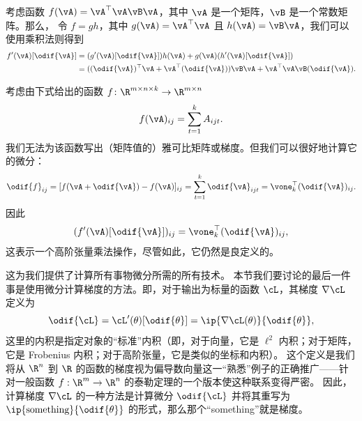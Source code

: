 \documentclass[../../book-main_zh.tex]{subfiles}
\begin{document}
\begin{example}
    考虑函数 \(f(\vA) = \vA^{\top}\vA\vB\vA\)，其中
    \(\vA\) 是一个矩阵，\(\vB\) 是一个常数矩阵。那么，
    令 \(f = gh\)，其中 \(g(\vA) = \vA^{\top}\vA\) 且 \(h(\vA)
    = \vB\vA\)，我们可以使用乘积法则得到
    \begin{align}
        f^{\prime}(\vA)[\odif{\vA}]
        &= (g^{\prime}(\vA)[\odif{\vA}])h(\vA) +
        g(\vA)(h^{\prime}(\vA)[\odif{\vA}]) \\
        &= ((\odif{\vA})^{\top}\vA + \vA^{\top}(\odif{\vA}))\vB\vA +
        \vA^{\top}\vA\vB(\odif{\vA}).
    \end{align}
\end{example}

\begin{example}
    考虑由下式给出的函数 \(f \colon \R^{m \times n \times k} \to
    \R^{m \times n}\)
    \begin{equation}
        f(\vA)_{ij} = \sum_{t = 1}^{k}A_{ijt}.
    \end{equation}
    我们无法为该函数写出（矩阵值的）雅可比矩阵或梯度。但我们可以很好地计算它的微分：
    \begin{equation}
        \odif{f}_{ij} = [f(\vA + \odif{\vA}) - f(\vA)]_{ij} = \sum_{t
        = 1}^{k}\odif{\vA}_{ijt} = \vone_{k}^{\top}(\odif{\vA})_{ij}.
    \end{equation}
    因此
    \begin{equation}
        (f^{\prime}(\vA)[\odif{\vA}])_{ij} = \vone_{k}^{\top}(\odif{\vA})_{ij},
    \end{equation}
    这表示一个高阶张量乘法操作，尽管如此，它仍然是良定义的。
\end{example}

这为我们提供了计算所有事物微分所需的所有技术。
本节我们要讨论的最后一件事是使用微分计算梯度的方法。即，对于输出为标量的函数 \(\cL\)，其梯度 \(\nabla \cL\) 定义为
\begin{equation}
    \odif{\cL} = \cL^{\prime}(\theta)[\odif{\theta}] = \ip{\nabla
    \cL(\theta)}{\odif{\theta}},
\end{equation}
这里的内积是指定对象的“标准”内积（即，对于向量，它是 \(\ell^{2}\) 内积；对于矩阵，它是 Frobenius 内积；对于高阶张量，它是类似的坐标和内积）。
这个定义是我们将从 $\R^n$ 到 $\R$ 的函数的梯度视为偏导数向量这一“熟悉”例子的正确推广——针对一般函数 $f : \R^m \to
\R^n$ 的泰勒定理的一个版本使这种联系变得严密。
因此，计算梯度 \(\nabla \cL\) 的一种方法是计算微分 \(\odif{\cL}\) 并将其重写为 \(\ip{\text{something}}{\odif{\theta}}\) 的形式，那么那个“something”就是梯度。
\end{document}
